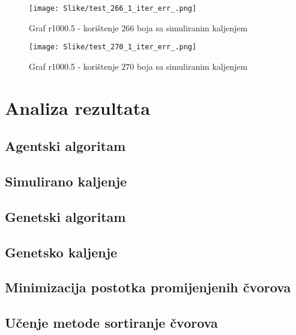 \documentclass[times, utf8, diplomski, numeric]{fer}
\begin{document}
\begin{figure}[H]
	\texttt{[image: Slike/test\_266\_1\_iter\_err\_.png]}
	\caption{Graf r1000.5 - korištenje $266$ boja sa simuliranim kaljenjem}
	\label{fig:r1000.5-266}
\end{figure}

\begin{figure}[H]
	\texttt{[image: Slike/test\_270\_1\_iter\_err\_.png]}
	\caption{Graf r1000.5 - korištenje $270$ boja sa simuliranim kaljenjem}
	\label{fig:r1000.5-270}
\end{figure}



\section{Analiza rezultata}

\subsection{Agentski algoritam}

\subsection{Simulirano kaljenje}

\subsection{Genetski algoritam}

\subsection{Genetsko kaljenje}

\subsection{Minimizacija postotka promijenjenih čvorova}

\subsection{Učenje metode sortiranje čvorova}
\end{document}
